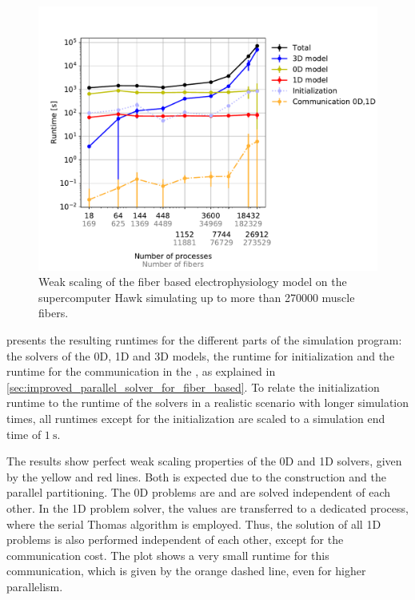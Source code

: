 \begin{figure}[H]
  \centering%
  \includegraphics[width=\textwidth]{images/results/studies/hawk_weak_scaling.pdf}%
  \caption{Weak scaling of the fiber based electrophysiology model on the supercomputer Hawk simulating up to more than \num{270000} muscle fibers.}%
  \label{fig:hawk_weak_scaling}%
\end{figure}

 presents the resulting runtimes for the different parts of the simulation program: the solvers of the 0D, 1D and 3D models, the runtime for initialization and the runtime for the communication in the , as explained in \cref{sec:improved_parallel_solver_for_fiber_based}.
To relate the initialization runtime to the runtime of the solvers in a realistic scenario with longer simulation times, all runtimes except for the initialization are scaled to a simulation end time of $\SI{1}{\second}$.

The results show perfect weak scaling properties of the 0D and 1D solvers, given by the yellow and red lines. Both is expected due to the construction and the parallel partitioning. The 0D problems are  and are solved independent of each other. In the 1D problem solver, the values are  transferred to a dedicated process, where the serial Thomas algorithm is employed. Thus, the solution of all 1D problems is also performed independent of each other, except for the communication cost.
The plot shows a very small runtime for this communication, which is given by the orange dashed line, even for higher parallelism.

